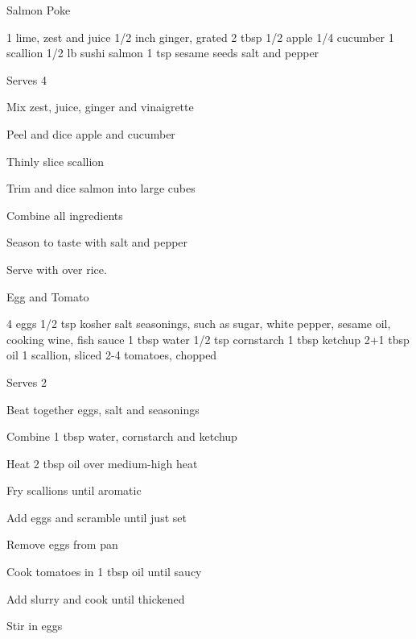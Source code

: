 
\begin{recipe}{Salmon Poke}{}
\begin{ingredients}
1 lime, zest and juice
1/2 inch ginger, grated
2 tbsp 
1/2 apple
1/4 cucumber
1 scallion
1/2 lb sushi salmon
1 tsp sesame seeds
salt and pepper
\end{ingredients}
\nextcolumn
Serves 4
\begin{steps}
    \item Mix zest, juice, ginger and vinaigrette
    \item Peel and dice apple and cucumber
    \item Thinly slice scallion
    \item Trim and dice salmon into large cubes
    \item Combine all ingredients
    \item Season to taste with salt and pepper
\end{steps}
Serve with  over rice.
\end{recipe}

\begin{denserecipe}{Egg and Tomato}{\vegetarian{}}
\begin{ingredients}
4 eggs
1/2 tsp kosher salt
seasonings, such as sugar, white pepper, sesame oil, cooking wine, fish sauce
1 tbsp water
1/2 tsp cornstarch
1 tbsp ketchup
2+1 tbsp oil
1 scallion, sliced
2-4 tomatoes, chopped
\end{ingredients}
\nextcolumn
Serves 2
\begin{steps}
    \item Beat together eggs, salt and seasonings
    \item Combine 1 tbsp water, cornstarch and ketchup
    \item Heat 2 tbsp oil over medium-high heat
    \item Fry scallions until aromatic
    \item Add eggs and scramble until just set
    \item Remove eggs from pan
    \item Cook tomatoes in 1 tbsp oil until saucy
    \item Add slurry and cook until thickened
    \item Stir in eggs
\end{steps}
\end{denserecipe}

